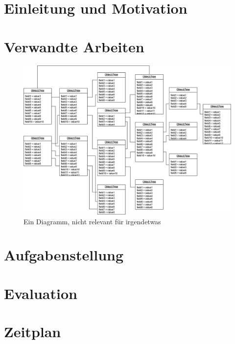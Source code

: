 \documentclass[german=true,thesistype=bachelor,proposal]{tubsthesis}
\begin{document}
\begin{thesis}

\chapter{Einleitung und Motivation} %
\lipsum

\chapter{Verwandte Arbeiten} %
\lipsum[1-3]

\begin{figure}
\centering
\includegraphics[width=\textwidth]{images/example_diagram.png}
\caption{Ein Diagramm, nicht relevant für irgendetwas~\cite{lisa}}
\label{fig:inga}
\end{figure}

\lipsum[4-5]

\chapter{Aufgabenstellung} %
\lipsum[1-3]

\chapter{Evaluation} %
\lipsum[1-4]

\chapter{Zeitplan} %


\end{thesis}
\end{document}
